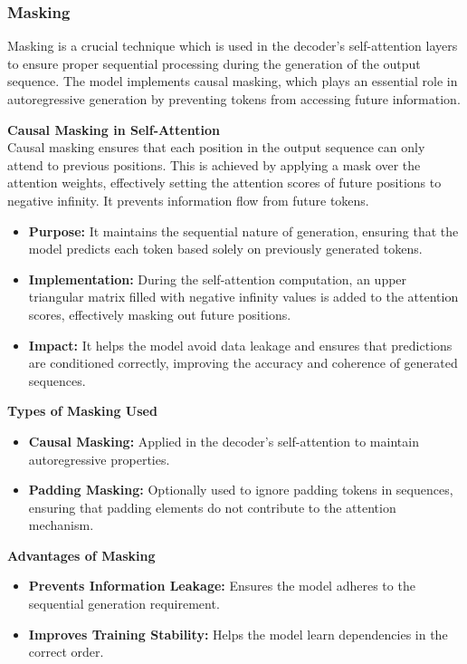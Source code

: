 \subsubsection{Masking}
Masking is a crucial technique which is used in the decoder's self-attention layers to ensure proper sequential processing during the generation of the output sequence. The model implements causal masking, which plays an essential role in autoregressive generation by preventing tokens from accessing future information.

\textbf{Causal Masking in Self-Attention}\\
Causal masking ensures that each position in the output sequence can only attend to previous positions. This is achieved by applying a mask over the attention weights, effectively setting the attention scores of future positions to negative infinity. It prevents information flow from future tokens.

\begin{itemize}
    \item \textbf{Purpose:} It maintains the sequential nature of generation, ensuring that the model predicts each token based solely on previously generated tokens.
    \item \textbf{Implementation:} During the self-attention computation, an upper triangular matrix filled with negative infinity values is added to the attention scores, effectively masking out future positions.
    \item \textbf{Impact:} It helps the model avoid data leakage and ensures that predictions are conditioned correctly, improving the accuracy and coherence of generated sequences.
\end{itemize}

\textbf{Types of Masking Used}

\begin{itemize}
    \item \textbf{Causal Masking:} Applied in the decoder's self-attention to maintain autoregressive properties.
    \item \textbf{Padding Masking:} Optionally used to ignore padding tokens in sequences, ensuring that padding elements do not contribute to the attention mechanism.
\end{itemize}

\textbf{Advantages of Masking}

\begin{itemize}
    \item \textbf{Prevents Information Leakage:} Ensures the model adheres to the sequential generation requirement.
    \item \textbf{Improves Training Stability:} Helps the model learn dependencies in the correct order.
\end{itemize}

